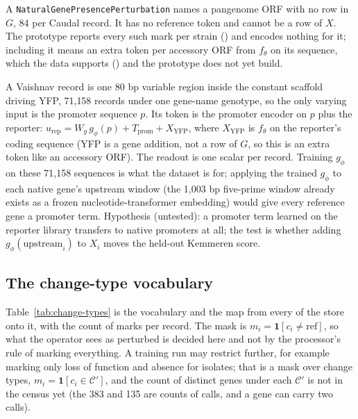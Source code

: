  A \texttt{NaturalGenePresencePerturbation} names a
pangenome ORF with no row in $G$, 84 per Caudal record. It has no reference token and
cannot be a row of $X$. The prototype reports every such mark per strain
() and encodes nothing for it; including it means an extra token
per accessory ORF from $f_\theta$ on its sequence, which the data supports
() and the prototype does not yet build.

 A Vaishnav record is one 80 bp variable region inside the
constant  scaffold driving YFP, 71{,}158 records under one gene-name
genotype, so the only varying input is the promoter sequence $p$. Its token is the
promoter encoder on $p$ plus the reporter: $u_{\mathrm{rep}}=W_g\,g_\phi(p)+T_{\mathrm{prom}}+X_{\mathrm{YFP}}$,
where $X_{\mathrm{YFP}}$ is $f_\theta$ on the reporter's coding sequence (YFP is a gene
addition, not a row of $G$, so this is an extra token like an accessory ORF). The
readout is one scalar per record. Training $g_\phi$ on these 71{,}158 sequences is what
the dataset is for; applying the trained $g_\phi$ to each native gene's upstream window
(the 1{,}003 bp five-prime window already exists as a frozen nucleotide-transformer
embedding) would give every reference gene a promoter term. Hypothesis (untested): a
promoter term learned on the reporter library transfers to native promoters at all; the
test is whether adding $g_\phi(\text{upstream}_i)$ to $X_i$ moves the held-out Kemmeren
score.

\subsection{The change-type vocabulary}
\label{sec:input-changes}

Table~\ref{tab:change-types} is the vocabulary and the map from every
 of the store onto it, with the count of marks per record. The
mask is $m_i=\mathbf{1}[c_i\neq\mathrm{ref}]$, so what the operator sees as perturbed
is decided here and not by the processor's rule of marking everything. A training run
may restrict further, for example marking only loss of function and absence for
isolates; that is a mask over change types, $m_i=\mathbf{1}[c_i\in\mathcal{C}']$, and
the count of distinct genes under each $\mathcal{C}'$ is not in the census yet (the
383 and 135 are counts of calls, and a gene can carry two calls).

